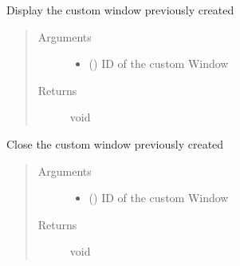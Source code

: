 \documentclass[a4paper,12pt,english]{sphinxmanual}
\begin{document}
\begin{fulllineitems}
\label{\detokenize{viewer/parameters:BIMDataViewer.openCustomWindow}}
Display the custom window previously created
\begin{quote}\begin{description}
\item[{Arguments}] \leavevmode\begin{itemize}
\item {} 
 () \textendash{} ID of the custom Window

\end{itemize}

\item[{Returns}] \leavevmode
void

\end{description}\end{quote}

\end{fulllineitems}



\begin{fulllineitems}
\label{\detokenize{viewer/parameters:BIMDataViewer.closeCustomWindow}}
Close the custom window previously created
\begin{quote}\begin{description}
\item[{Arguments}] \leavevmode\begin{itemize}
\item {} 
 () \textendash{} ID of the custom Window

\end{itemize}

\item[{Returns}] \leavevmode
void

\end{description}\end{quote}

\end{fulllineitems}
\end{document}
